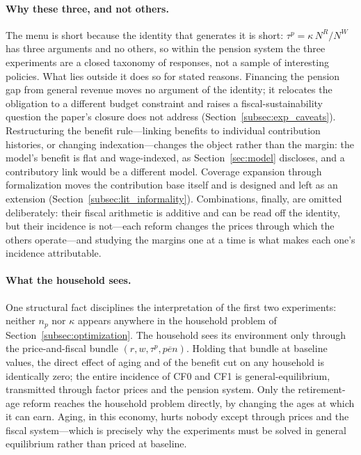 \documentclass[12pt,a4paper]{article}
\begin{document}
\paragraph{Why these three, and not others.} The menu is short because the identity that generates it is short: $\tau^p = \kappa\, N^R/N^W$ has three arguments and no others, so within the pension system the three experiments are a closed taxonomy of responses, not a sample of interesting policies. What lies outside it does so for stated reasons. Financing the pension gap from general revenue moves no argument of the identity; it relocates the obligation to a different budget constraint and raises a fiscal-sustainability question the paper's closure does not address (Section~\ref{subsec:exp_caveats}). Restructuring the benefit rule---linking benefits to individual contribution histories, or changing indexation---changes the object rather than the margin: the model's benefit is flat and wage-indexed, as Section~\ref{sec:model} discloses, and a contributory link would be a different model. Coverage expansion through formalization moves the contribution base itself and is designed and left as an extension (Section~\ref{subsec:lit_informality}). Combinations, finally, are omitted deliberately: their fiscal arithmetic is additive and can be read off the identity, but their incidence is not---each reform changes the prices through which the others operate---and studying the margins one at a time is what makes each one's incidence attributable.

\paragraph{What the household sees.} One structural fact disciplines the interpretation of the first two experiments: neither $n_p$ nor $\kappa$ appears anywhere in the household problem of Section~\ref{subsec:optimization}. The household sees its environment only through the price-and-fiscal bundle $(r, w, \tau^p, \overline{pen})$. Holding that bundle at baseline values, the direct effect of aging and of the benefit cut on any household is identically zero; the entire incidence of CF0 and CF1 is general-equilibrium, transmitted through factor prices and the pension system. Only the retirement-age reform reaches the household problem directly, by changing the ages at which it can earn. Aging, in this economy, hurts nobody except through prices and the fiscal system---which is precisely why the experiments must be solved in general equilibrium rather than priced at baseline.
\end{document}
